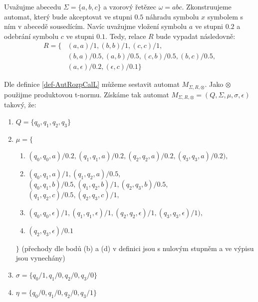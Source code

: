\documentclass[a4paper,10pt]{article}
\begin{document}
\begin{example} \label{ex-AutRozpCalL}
 Uvažujme abecedu $\Sigma = \{a, b, c\}$ a vzorový řetězec $\omega = abc$. Zkonstruujeme automat, který bude akceptovat ve stupni $0.5$ náhradu symbolu $x$ symbolem s ním v abecedě sousedícím. Navíc uvažujme vložení symbolu $a$ ve stupni $0.2$ a odebrání symbolu $c$ ve stupni $0.1$. Tedy, relace $R$ bude vypadat následovně:
 \begin{align*}
  R = \{ 
   & (a, a)/1, (b, b)/1, (c, c)/1, \\
   & (b, a)/0.5, (a, b)/0.5, (c, b)/0.5, (b, c)/0.5, \\
   & (a, \epsilon)/0.2, (\epsilon, c)/0.1 \}
 \end{align*}

 Dle definice \ref{def-AutRozpCalL} můžeme sestavit automat $M_{\Sigma, R, \otimes}$. Jako $\otimes$ použijme produktovou t-normu. Získáme tak automat $M_{\Sigma, R, \otimes} = (Q, \Sigma, \mu, \sigma, \epsilon)$ takový, že:
  \begin{enumerate}
  \item $Q = \{ q_0, q_1, q_2, q_3 \}$
  \item $\mu = \{ $
  \begin{enumerate}
   
   \item $(q_0, q_0, a)/0.2, (q_1, q_1, a)/0.2, (q_2, q_2, a)/0.2, (q_3, q_3, a)/0.2),$
   \item $(q_0, q_1, a)/1, (q_1, q_2, a)/0.5,$ \\
   $(q_0, q_1, b)/0.5, (q_1, q_2, b)/1, (q_2, q_3, b)/0.5,$ \\
   $(q_1, q_2, c)/0.5, (q_2, q_3, c)/1,$
   \addtocounter{enumii}{1} %
   \item $(q_0, q_0, \epsilon)/1, (q_1, q_1, \epsilon)/1, (q_2, q_2, \epsilon)/1, (q_3, q_3, \epsilon)/1),$
   \item $(q_2, q_3, \epsilon)/0.1$
   \addtocounter{enumii}{1} %
  \end{enumerate}
  $ \} $ (přechody dle bodů (b) a (d) v definici jsou s nulovým stupněm a ve výpisu jsou vynechány)
  \item $\sigma = \{ q_0/1, q_1/0, q_2/0, q_3/0  \}$
  \item $\eta = \{ q_0/0, q_1/0, q_2/0, q_3/1  \}$
  \\ 
 \end{enumerate}


\end{example}
\end{document}

